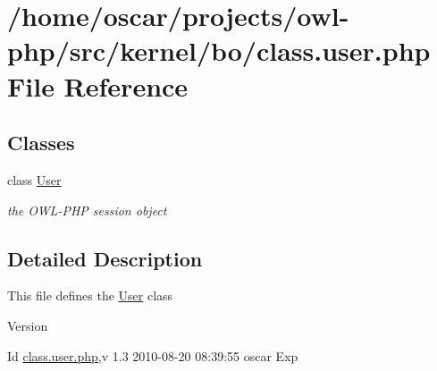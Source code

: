\section{/home/oscar/projects/owl-\/php/src/kernel/bo/class.user.php File Reference}
\label{class_8user_8php}
\subsection*{Classes}
\begin{DoxyCompactItemize}
\item 
class \hyperlink{classUser}{User}
\begin{DoxyCompactList}\small\item\em the OWL-\/PHP session object \item\end{DoxyCompactList}\end{DoxyCompactItemize}


\subsection{Detailed Description}
This file defines the \hyperlink{classUser}{User} class \begin{DoxyVersion}{Version}

\end{DoxyVersion}
\begin{DoxyParagraph}{Id}
\hyperlink{class_8user_8php}{class.user.php},v 1.3 2010-\/08-\/20 08:39:55 oscar Exp 
\end{DoxyParagraph}

